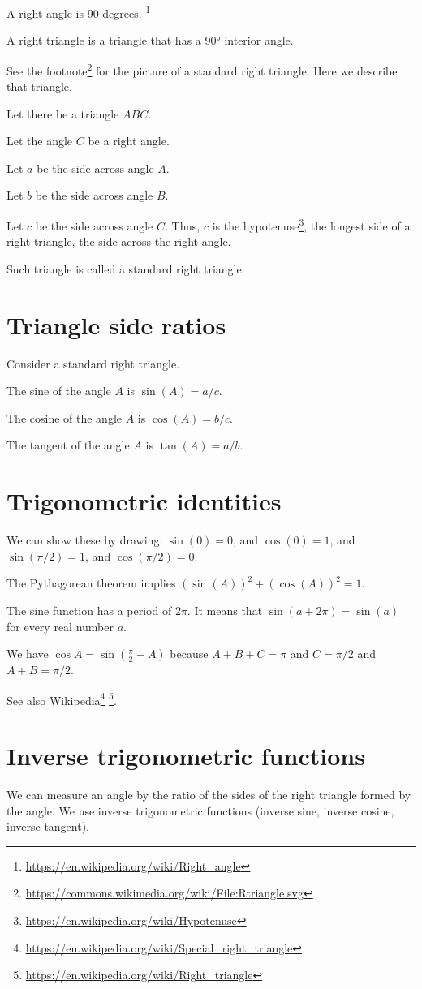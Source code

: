 A right angle is 90 degrees.%
\footnote{\url{https://en.wikipedia.org/wiki/Right_angle}}

A right triangle is a triangle that has a \ang{90} interior angle.

See the footnote\footnote{\url{https://commons.wikimedia.org/wiki/File:Rtriangle.svg}}
for the picture of a standard right triangle.
Here we describe that triangle.

Let there be a triangle \(ABC\).

Let the angle \(C\) be a right angle.

Let \(a\) be the side across angle \(A\).

Let \(b\) be the side across angle \(B\).

Let \(c\) be the side across angle \(C\).
Thus, \(c\) is the hypotenuse\footnote{\url{https://en.wikipedia.org/wiki/Hypotenuse}},
the longest side of a right triangle,
the side across the right angle.

Such triangle is called a standard right triangle.

\section*{Triangle side ratios}

Consider a standard right triangle.

The sine of the angle \(A\) is \(\sin(A) = a/c\).

The cosine of the angle \(A\) is \(\cos(A) = b/c\).

The tangent of the angle \(A\) is \(\tan(A) = a/b\).

\section*{Trigonometric identities}

We can show these by drawing:
\( \sin(0) = 0 \),
and \( \cos(0) = 1 \),
and \( \sin(\pi/2) = 1 \),
and \( \cos(\pi/2) = 0 \).

The Pythagorean theorem implies \((\sin(A))^2 + (\cos(A))^2 = 1\).

The sine function has a period of \(2\pi\).
It means that \(\sin(a + 2\pi) = \sin(a)\) for every real number \(a\).

We have \(\cos A = \sin\left(\frac{\pi}{2}-A\right)\)
because \(A+B+C = \pi\) and \(C = \pi/2\) and \(A+B = \pi/2\).

See also Wikipedia\footnote{\url{https://en.wikipedia.org/wiki/Special_right_triangle}}%
\footnote{\url{https://en.wikipedia.org/wiki/Right_triangle}}.

\section*{Inverse trigonometric functions}

We can measure an angle by the ratio of the sides of the right triangle formed by the angle.
We use inverse trigonometric functions (inverse sine, inverse cosine, inverse tangent).
